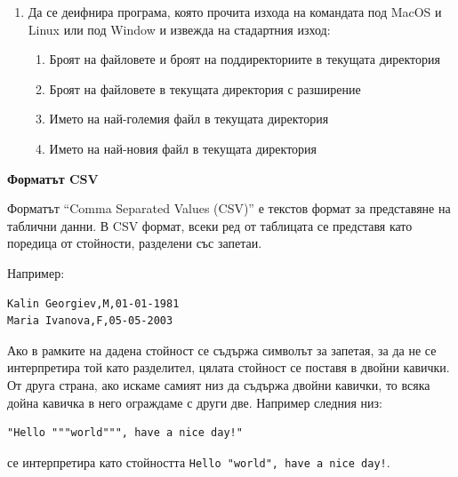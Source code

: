 \begin{enumerate}[]

	\item Да се деифнира програма, която прочита изхода на командата  под MacOS и Linux или  под Window и извежда на стадартния изход:
	\begin{enumerate}[label=\alph*)]
		\item Броят на файловете и броят на поддиректориите в текущата директория
		\item Броят на файловете в текущата директория с разширение 
		\item Името на най-големия файл в текущата директория
		\item Името на най-новия файл в текущата директория
	\end{enumerate}

\end{enumerate}

\begin{mdframed}[hidealllines=true,backgroundcolor=gray!20]
\textbf{Форматът CSV}

Форматът ``Comma Separated Values (CSV)'' е текстов формат за представяне на таблични данни. В CSV формат, всеки ред от таблицата се представя като поредица от стойности, разделени със запетаи. 

Например:
\begin{verbatim}
Kalin Georgiev,M,01-01-1981
Maria Ivanova,F,05-05-2003
\end{verbatim}

Ако в рамките на дадена стойност се съдържа символът за запетая, за да не се интерпретира той като разделител, цялата стойност се поставя в двойни кавички. От друга страна, ако искаме самият низ да съдържа двойни кавички, то всяка дойна кавичка в него ограждаме с други две. Например следния низ:
\begin{verbatim}
"Hello """world""", have a nice day!"
\end{verbatim}
се интерпретира като стойността \verb#Hello "world", have a nice day!#.

\end{mdframed}

